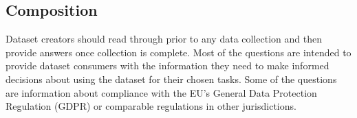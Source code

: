 \subsection{Composition}

Dataset creators should read through  prior to
any data collection and then provide answers once  collection is
complete. Most of the questions  are intended to
provide dataset consumers with the information they need to make
informed decisions about using the dataset for their chosen
tasks. Some of the questions are  information
about compliance with the EU's General Data Protection Regulation
(GDPR) or comparable regulations in other jurisdictions.

\\

